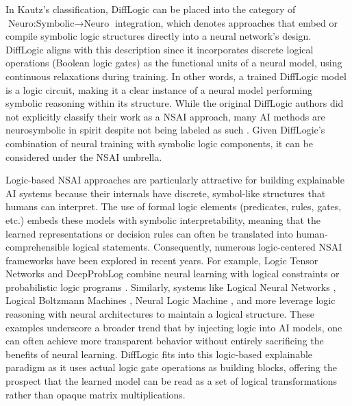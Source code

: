 In Kautz’s classification, DiffLogic can be placed into the category of $\text{Neuro:Symbolic} 
\rightarrow \text{Neuro}$ integration, which denotes approaches that embed or compile symbolic logic structures directly into a neural network’s design. DiffLogic aligns with this description since it incorporates discrete logical operations (Boolean logic gates) as the functional units of a neural model, using continuous relaxations during training. In other words, a trained DiffLogic model is a logic circuit, making it a clear instance of a neural model performing symbolic reasoning within its structure. While the original DiffLogic authors did not explicitly classify their work as a NSAI approach, many AI methods are neurosymbolic in spirit despite not being labeled as such \cite{sarker2021neurosymbolicartificialintelligencecurrent}. Given DiffLogic's combination of neural training with symbolic logic components, it can be considered under the NSAI umbrella.

Logic-based NSAI approaches are particularly attractive for building explainable AI systems because their internals have discrete, symbol-like structures that humans can interpret. The use of formal logic elements (predicates, rules, gates, etc.) embeds these models with symbolic interpretability, meaning that the learned representations or decision rules can often be translated into human-comprehensible logical statements. Consequently, numerous logic-centered NSAI frameworks have been explored in recent years. For example, Logic Tensor Networks and DeepProbLog combine neural learning with logical constraints or probabilistic logic programs \cite{Badreddine_2022, manhaeve2018deepproblogneuralprobabilisticlogic}. Similarly, systems like Logical Neural Networks \cite{riegel2020logicalneuralnetworks}, Logical Boltzmann Machines \cite{tran2021logicalboltzmannmachines}, Neural Logic Machine \cite{dong2019neurallogicmachines}, and more leverage logic reasoning with neural architectures to maintain a logical structure. These examples underscore a broader trend that by injecting logic into AI models, one can often achieve more transparent behavior without entirely sacrificing the benefits of neural learning. DiffLogic fits into this logic-based explainable paradigm as it uses actual logic gate operations as building blocks, offering the prospect that the learned model can be read as a set of logical transformations rather than opaque matrix multiplications.

